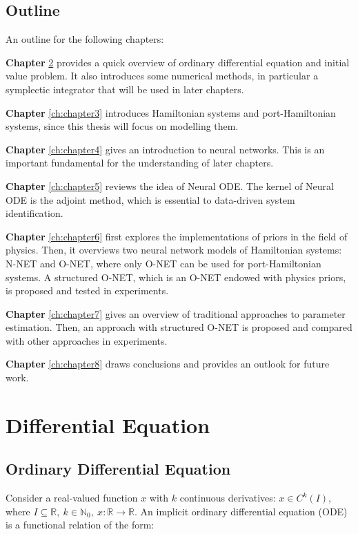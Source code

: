 \documentclass[
	parskip, 			   %
	twoside, 			   %
	DIV=14, 			   %
	BCOR=15.0mm, 		   %
	headsepline, 		   %
	open=right, 		   %
	captions=tableheading, %
	bibliography=totoc,    %
	numbers=noenddot       %
]{scrreprt}
\begin{document}
\section{Outline}
An outline for the following chapters:

\textbf{Chapter} \ref{ch:chapter2} provides a quick overview of ordinary differential equation and initial value problem. It also introduces some numerical methods, in particular a symplectic integrator that will be used in later chapters.

\textbf{Chapter} \ref{ch:chapter3} introduces Hamiltonian systems and port-Hamiltonian systems, since this thesis will focus on modelling them.

\textbf{Chapter} \ref{ch:chapter4} gives an introduction to neural networks. This is an important fundamental for the understanding of later chapters.

\textbf{Chapter} \ref{ch:chapter5} reviews the idea of Neural ODE. The kernel of Neural ODE is the adjoint method, which is essential to data-driven system identification.

\textbf{Chapter} \ref{ch:chapter6} first explores the implementations of priors in the field of physics. Then, it overviews two neural network models of Hamiltonian systems: N-NET and O-NET, where only O-NET can be used for port-Hamiltonian systems. A structured O-NET, which is an O-NET endowed with physics priors, is proposed and tested in experiments.

\textbf{Chapter} \ref{ch:chapter7} gives an overview of traditional approaches to parameter estimation. Then, an approach with structured O-NET is proposed and compared with other approaches in experiments.

\textbf{Chapter} \ref{ch:chapter8} draws conclusions and provides an outlook for future work.


\clearpage
\chapter{Differential Equation}
\label{ch:chapter2}

\section{Ordinary Differential Equation}
Consider a real-valued function $x$ with $k$ continuous derivatives: $x \in C^{k}(I)$, where $ I \subseteq \mathbb{R}, \: k \in \mathbb{N}_{0}, \: x: \mathbb{R} \rightarrow \mathbb{R}$. An implicit ordinary differential equation (ODE) is a functional relation of the form:
\end{document}
